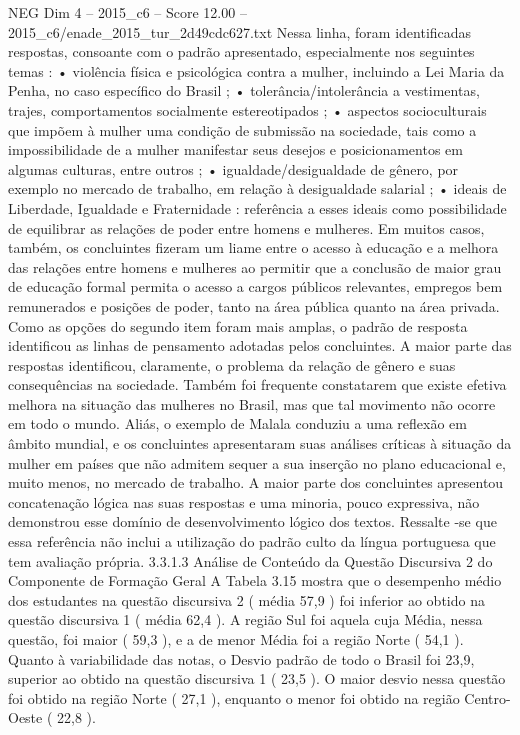 \begin{textsample}{NEG Dim 4 – 2015\_c6 – Score 12.00 – 2015\_c6/enade\_2015\_tur\_2d49cdc627.txt}
Nessa linha, foram identificadas respostas, consoante com o padrão apresentado, especialmente nos seguintes temas : • violência física e psicológica contra a mulher, incluindo a Lei Maria da Penha, no caso específico do Brasil ; • tolerância/intolerância a vestimentas, trajes, comportamentos socialmente estereotipados ; • aspectos socioculturais que impõem à mulher uma condição de submissão na sociedade, tais como a impossibilidade de a mulher manifestar seus desejos e posicionamentos em algumas culturas, entre outros ; • igualdade/desigualdade de gênero, por exemplo no mercado de trabalho, em relação à desigualdade salarial ; • ideais de Liberdade, Igualdade e Fraternidade : referência a esses ideais como possibilidade de equilibrar as relações de poder entre homens e mulheres.
Em muitos casos, também, os concluintes fizeram um liame entre o acesso à educação e a melhora das relações entre homens e mulheres ao permitir que a conclusão de maior grau de educação formal permita o acesso a cargos públicos relevantes, empregos bem remunerados e posições de poder, tanto na área pública quanto na área privada.
Como as opções do segundo item foram mais amplas, o padrão de resposta identificou as linhas de pensamento adotadas pelos concluintes.
A maior parte das respostas identificou, claramente, o problema da relação de gênero e suas consequências na sociedade.
Também foi frequente constatarem que existe efetiva melhora na situação das mulheres no Brasil, mas que tal movimento não ocorre em todo o mundo.
Aliás, o exemplo de Malala conduziu a uma reflexão em âmbito mundial, e os concluintes apresentaram suas análises críticas à situação da mulher em países que não admitem sequer a sua inserção no plano educacional e, muito menos, no mercado de trabalho.
A maior parte dos concluintes apresentou concatenação lógica nas suas respostas e uma minoria, pouco expressiva, não demonstrou esse domínio de desenvolvimento lógico dos textos.
Ressalte -se que essa referência não inclui a utilização do padrão culto da língua portuguesa que tem avaliação própria. 3.3.1.3 Análise de Conteúdo da Questão Discursiva 2 do Componente de Formação Geral A Tabela 3.15 mostra que o desempenho médio dos estudantes na questão discursiva 2 ( média 57,9 ) foi inferior ao obtido na questão discursiva 1 ( média 62,4 ).
A região Sul foi aquela cuja Média, nessa questão, foi maior ( 59,3 ), e a de menor Média foi a região Norte ( 54,1 ).
Quanto à variabilidade das notas, o Desvio padrão de todo o Brasil foi 23,9, superior ao obtido na questão discursiva 1 ( 23,5 ).
O maior desvio nessa questão foi obtido na região Norte ( 27,1 ), enquanto o menor foi obtido na região Centro-Oeste ( 22,8 ).

\end{textsample}
